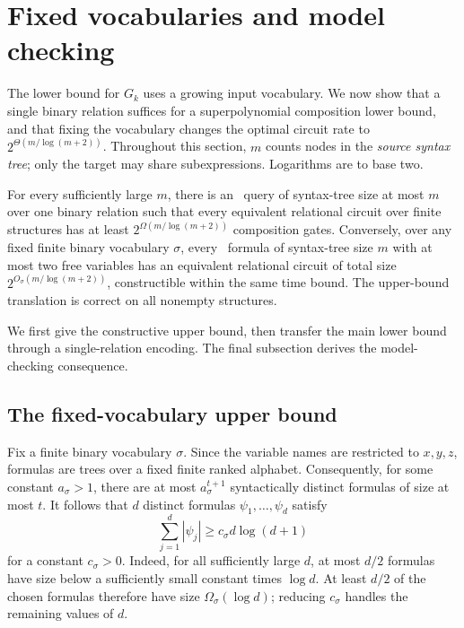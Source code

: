 \section{Fixed vocabularies and model checking}\label{sec:fixed-vocabulary}
The lower bound for $G_k$ uses a growing input vocabulary. We now show
that a single binary relation suffices for a superpolynomial composition
lower bound, and that fixing the vocabulary changes the optimal circuit
rate to $2^{\Theta(m/\log(m+2))}$. Throughout this section, $m$ counts
nodes in the \emph{source syntax tree}; only the target may share
subexpressions. Logarithms are to base two.

\begin{theorem}
\label{thm:fixed-vocabulary:formal}
For every sufficiently large $m$, there is an \FOthree\ query of
syntax-tree size at most $m$ over one binary relation such that every
equivalent relational circuit over finite structures has at least
$2^{\Omega(m/\log(m+2))}$ composition gates.
Conversely, over any fixed finite binary vocabulary $\sigma$, every
\FOthree\ formula of syntax-tree size $m$ with at most two free variables
has an equivalent relational circuit of total size
$2^{O_\sigma(m/\log(m+2))}$, constructible within the same time bound.
The upper-bound translation is correct on all nonempty structures.
\end{theorem}

We first give the constructive upper bound, then transfer the main
lower bound through a single-relation encoding. The final subsection
derives the model-checking consequence.

\subsection{The fixed-vocabulary upper bound}\label{sec:fixed-upper}
Fix a finite binary vocabulary $\sigma$. Since the variable names
are restricted to $x,y,z$, formulas are trees over a fixed finite
ranked alphabet. Consequently, for some constant $a_\sigma>1$, there
are at most $a_\sigma^{t+1}$ syntactically distinct formulas of size
at most $t$. It follows that $d$ distinct formulas
$\psi_1,\ldots,\psi_d$ satisfy
\[
 \sum_{j=1}^d|\psi_j|
 \ge c_\sigma d\log(d+1)
\]
for a constant $c_\sigma>0$.
Indeed, for all sufficiently large $d$, at most $d/2$ formulas have
size below a sufficiently small constant times $\log d$.
At least $d/2$ of the chosen formulas therefore have size
$\Omega_\sigma(\log d)$; reducing $c_\sigma$ handles the remaining
values of $d$.

